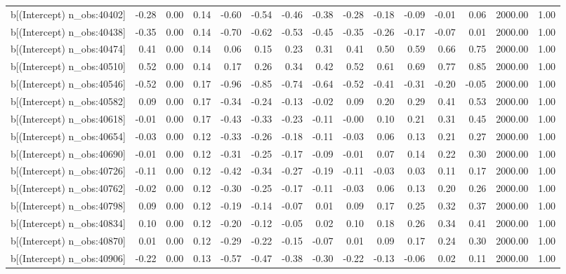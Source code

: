 \begin{table}[ht]
\begin{tabular}{rrrrrrrrrrrrrrr}
  b[(Intercept) n\_obs:40402] & -0.28 & 0.00 & 0.14 & -0.60 & -0.54 & -0.46 & -0.38 & -0.28 & -0.18 & -0.09 & -0.01 & 0.06 & 2000.00 & 1.00 \\ 
  b[(Intercept) n\_obs:40438] & -0.35 & 0.00 & 0.14 & -0.70 & -0.62 & -0.53 & -0.45 & -0.35 & -0.26 & -0.17 & -0.07 & 0.01 & 2000.00 & 1.00 \\ 
  b[(Intercept) n\_obs:40474] & 0.41 & 0.00 & 0.14 & 0.06 & 0.15 & 0.23 & 0.31 & 0.41 & 0.50 & 0.59 & 0.66 & 0.75 & 2000.00 & 1.00 \\ 
  b[(Intercept) n\_obs:40510] & 0.52 & 0.00 & 0.14 & 0.17 & 0.26 & 0.34 & 0.42 & 0.52 & 0.61 & 0.69 & 0.77 & 0.85 & 2000.00 & 1.00 \\ 
  b[(Intercept) n\_obs:40546] & -0.52 & 0.00 & 0.17 & -0.96 & -0.85 & -0.74 & -0.64 & -0.52 & -0.41 & -0.31 & -0.20 & -0.05 & 2000.00 & 1.00 \\ 
  b[(Intercept) n\_obs:40582] & 0.09 & 0.00 & 0.17 & -0.34 & -0.24 & -0.13 & -0.02 & 0.09 & 0.20 & 0.29 & 0.41 & 0.53 & 2000.00 & 1.00 \\ 
  b[(Intercept) n\_obs:40618] & -0.01 & 0.00 & 0.17 & -0.43 & -0.33 & -0.23 & -0.11 & -0.00 & 0.10 & 0.21 & 0.31 & 0.45 & 2000.00 & 1.00 \\ 
  b[(Intercept) n\_obs:40654] & -0.03 & 0.00 & 0.12 & -0.33 & -0.26 & -0.18 & -0.11 & -0.03 & 0.06 & 0.13 & 0.21 & 0.27 & 2000.00 & 1.00 \\ 
  b[(Intercept) n\_obs:40690] & -0.01 & 0.00 & 0.12 & -0.31 & -0.25 & -0.17 & -0.09 & -0.01 & 0.07 & 0.14 & 0.22 & 0.30 & 2000.00 & 1.00 \\ 
  b[(Intercept) n\_obs:40726] & -0.11 & 0.00 & 0.12 & -0.42 & -0.34 & -0.27 & -0.19 & -0.11 & -0.03 & 0.03 & 0.11 & 0.17 & 2000.00 & 1.00 \\ 
  b[(Intercept) n\_obs:40762] & -0.02 & 0.00 & 0.12 & -0.30 & -0.25 & -0.17 & -0.11 & -0.03 & 0.06 & 0.13 & 0.20 & 0.26 & 2000.00 & 1.00 \\ 
  b[(Intercept) n\_obs:40798] & 0.09 & 0.00 & 0.12 & -0.19 & -0.14 & -0.07 & 0.01 & 0.09 & 0.17 & 0.25 & 0.32 & 0.37 & 2000.00 & 1.00 \\ 
  b[(Intercept) n\_obs:40834] & 0.10 & 0.00 & 0.12 & -0.20 & -0.12 & -0.05 & 0.02 & 0.10 & 0.18 & 0.26 & 0.34 & 0.41 & 2000.00 & 1.00 \\ 
  b[(Intercept) n\_obs:40870] & 0.01 & 0.00 & 0.12 & -0.29 & -0.22 & -0.15 & -0.07 & 0.01 & 0.09 & 0.17 & 0.24 & 0.30 & 2000.00 & 1.00 \\ 
  b[(Intercept) n\_obs:40906] & -0.22 & 0.00 & 0.13 & -0.57 & -0.47 & -0.38 & -0.30 & -0.22 & -0.13 & -0.06 & 0.02 & 0.11 & 2000.00 & 1.00 \\ 

\end{tabular}
\end{table}
